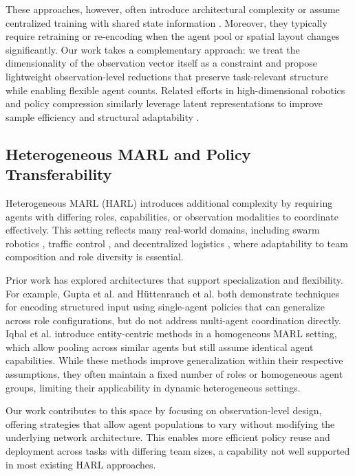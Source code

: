 \documentclass{article}
\begin{document}
These approaches, however, often introduce architectural complexity or assume centralized 
training with shared state information \cite{foerster2017}. Moreover, they typically require 
retraining or re-encoding when the agent pool or spatial layout changes significantly. 
Our work takes a complementary approach: we treat the dimensionality of the observation vector 
itself as a constraint and propose lightweight observation-level reductions that preserve 
task-relevant structure while enabling flexible agent counts. 
Related efforts in high-dimensional robotics and policy compression similarly 
leverage latent representations to improve sample efficiency and structural 
adaptability \cite{bitzer2010, tangkaratt2016}.


\subsection{Heterogeneous MARL and Policy Transferability}

Heterogeneous MARL (HARL) introduces additional complexity by requiring agents with differing
roles, capabilities, or observation modalities to coordinate effectively. This setting reflects
many real-world domains, including swarm robotics \cite{hoang2023}, traffic control \cite{calvo2018},
and decentralized logistics \cite{rizk2019}, where adaptability to team composition and role diversity
is essential.

Prior work has explored architectures that support specialization and flexibility. 
For example, Gupta et al. \cite{gupta2017a} and Hüttenrauch et al. \cite{huttenrauch2019} 
both demonstrate techniques for encoding structured input using single-agent policies that 
can generalize across role configurations, but do not address multi-agent coordination directly. 
Iqbal et al. \cite{iqbal2021} introduce entity-centric methods in a homogeneous MARL setting, 
which allow pooling across similar agents but still assume identical agent capabilities. 
While these methods improve generalization within their respective assumptions, they often 
maintain a fixed number of roles or homogeneous agent groups, limiting their applicability 
in dynamic heterogeneous settings.

Our work contributes to this space by focusing on observation-level design, offering strategies
that allow agent populations to vary without modifying the underlying network architecture.
This enables more efficient policy reuse and deployment across tasks with differing team sizes,
a capability not well supported in most existing HARL approaches.
\end{document}
